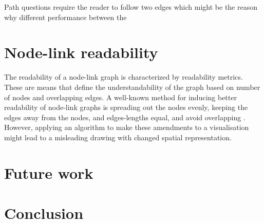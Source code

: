 \documentclass{l4proj}
\begin{document}
Path questions require the reader to follow two edges which might be the reason why different performance between the

\section{Node-link readability}

The readability of a node-link graph is characterized by readability metrics. These are means that define the understandability of the graph based on number of nodes and overlapping edges. A well-known method for inducing better readability of node-link graphs is spreading out the nodes evenly, keeping the edges away from the nodes, and edges-lengths equal, and avoid overlapping \cite{dunne2015readability}. However, applying an algorithm to make these amendments to a visualisation might lead to a misleading drawing with changed spatial representation.


\section{Future work}

\section{Conclusion}
\end{document}
